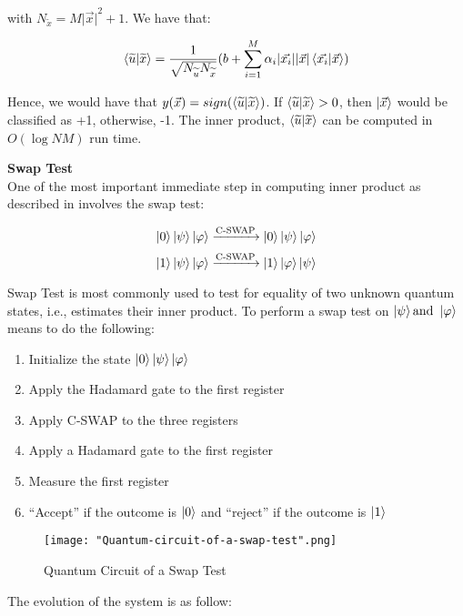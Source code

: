\documentclass[11pt]{article}
\begin{document}
with $N_{\widetilde{x}} = M {\vert \vec{x} \vert}^{2} + 1$. We have that:

$$\bra{\widetilde{u}}\ket{\widetilde{x}} = \frac{1}{\sqrt{N_{\widetilde{u}} N_{\widetilde{x}}}} (b + \sum_{i=1}^{M} \alpha_{i} \vert \vec{x_{i}} \vert \vert \vec{x} \vert \bra{\vec{x_{i}}}\ket{\vec{x}})$$

Hence, we would have that $y(\vec{x}) = sign(\bra{\widetilde{u}}\ket{\widetilde{x}})$. If $\bra{\widetilde{u}}\ket{\widetilde{x}} > 0$, then $\ket{\vec{x}}$ would be classified as +1, otherwise, -1. The inner product, $\bra{\widetilde{u}}\ket{\widetilde{x}}$ can be computed in $O(\log NM)$ run time.

\medbreak

\textbf{\large Swap Test} \\

One of the most important immediate step in computing inner product as described in \cite{InnerProduct} involves the swap test: 

$$\ket{0} \ket{\psi} \ket{\varphi} \xrightarrow[]{\text{C-SWAP}} \ket{0} \ket{\psi} \ket{\varphi}$$
$$\ket{1} \ket{\psi} \ket{\varphi} \xrightarrow[]{\text{C-SWAP}} \ket{1} \ket{\varphi} \ket{\psi}$$

Swap Test is most commonly used to test for equality of two unknown quantum states, i.e., estimates their inner product. To perform a swap test on $\ket{\psi} \text{and } \ket{\varphi}$ means to do the following: 

\begin{enumerate}
\item Initialize the state $\ket{0}\ket{\psi}\ket{\varphi}$
\item Apply the Hadamard gate to the first register
\item Apply C-SWAP to the three registers
\item Apply a Hadamard gate to the first register
\item Measure the first register
\item ``Accept'' if the outcome is $\ket{0}$ and ``reject'' if the outcome is $\ket{1}$

\end{enumerate}

\begin{figure}[h]
    \centering
    \texttt{[image: "Quantum-circuit-of-a-swap-test".png]}
    \caption{Quantum Circuit of a Swap Test}
    \label{fig: SVM}
\end{figure}

The evolution of the system is as follow:
\end{document}

